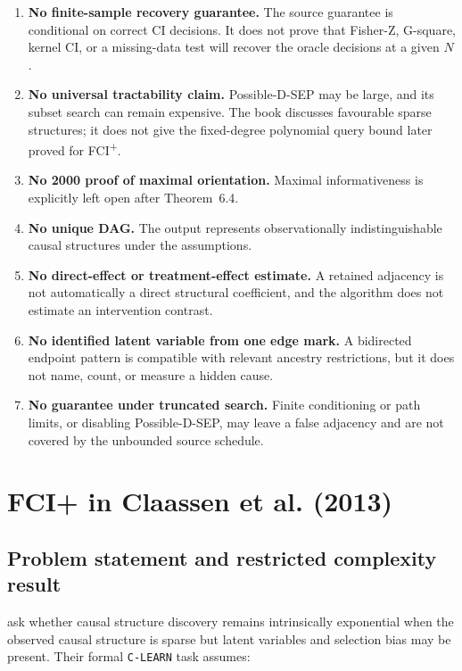 \documentclass[11pt,a4paper,oneside]{report}
\newcommand{\FCIplus}{FCI\textsuperscript{+}}
\newcommand{\code}[1]{\texttt{#1}}
\begin{document}
\begin{enumerate}[leftmargin=2em]
  \item \textbf{No finite-sample recovery guarantee.}  The source guarantee is
        conditional on correct CI decisions.  It does not prove that Fisher-Z,
        G-square, kernel CI, or a missing-data test will recover the oracle
        decisions at a given \(N\).
  \item \textbf{No universal tractability claim.}  Possible-D-SEP may be large,
        and its subset search can remain expensive.  The book discusses
        favourable sparse structures; it does not give the fixed-degree
        polynomial query bound later proved for \FCIplus{}.
  \item \textbf{No 2000 proof of maximal orientation.}  Maximal
        informativeness is explicitly left open after Theorem~6.4.
  \item \textbf{No unique DAG.}  The output represents observationally
        indistinguishable causal structures under the assumptions.
  \item \textbf{No direct-effect or treatment-effect estimate.}  A retained
        adjacency is not automatically a direct structural coefficient, and
        the algorithm does not estimate an intervention contrast.
  \item \textbf{No identified latent variable from one edge mark.}  A
        bidirected endpoint pattern is compatible with relevant ancestry
        restrictions, but it does not name, count, or measure a hidden cause.
  \item \textbf{No guarantee under truncated search.}  Finite conditioning or
        path limits, or disabling Possible-D-SEP, may leave a false adjacency
        and are not covered by the unbounded source schedule.
\end{enumerate}


\chapter{FCI+ in Claassen et al. (2013)}
\label{chap:fci-plus-source}

\section{Problem statement and restricted complexity result}

\citet{claassen2013learning} ask whether causal structure discovery remains
intrinsically exponential when the observed causal structure is sparse but
latent variables and selection bias may be present.  Their formal
\code{C-LEARN} task assumes:
\end{document}
